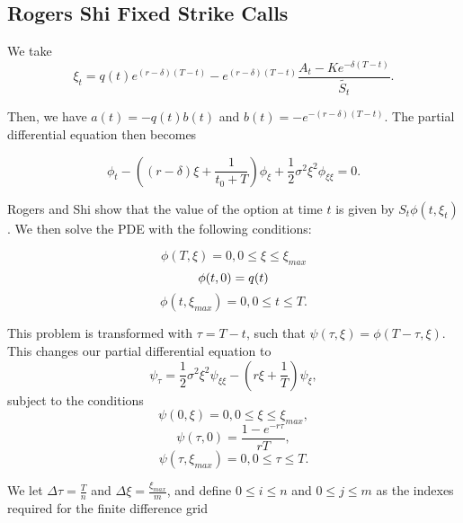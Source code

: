 \documentclass{article}
\begin{document}
\subsection{Rogers Shi Fixed Strike Calls}
We take
\begin{equation}
  \xi_t = q(t)e^{(r-\delta)(T-t)} - e^{(r-\delta)(T-t)}\frac{A_t - Ke^{-\delta(T-t)}}{\tilde{S_t}}.
\end{equation}

Then, we have \( a(t) = -q(t)b(t) \) and \(b(t) = -e^{-(r-\delta)(T-t)}\). The partial differential equation then becomes

\begin{equation}
  \phi_t - ( (r-\delta)\xi + \frac{1}{t_0 + T} ) \phi_\xi + \frac{1}{2}\sigma^2\xi^2\phi_{\xi\xi} = 0.
\end{equation}

Rogers and Shi show that the value of the option at time \(t\) is given by \(S_t\phi(t, \xi_t)\). We then solve the PDE with the following conditions:

\begin{equation}
  \phi(T, \xi) = 0, 0 \le \xi \le \xi_{max}
\end{equation}
\begin{equation}
  \phi(t, 0) = q(t) \\
\end{equation}
\begin{equation}
  \phi(t, \xi_{max}) = 0, 0 \le t \le T.
\end{equation}

This problem is transformed with \(\tau = T - t \), such that \(\psi(\tau, \xi) = \phi(T-\tau, \xi)\). This changes our partial differential equation to
\begin{equation}
  \psi_\tau = \frac{1}{2}\sigma^2\xi^2\psi_{\xi\xi} - (r\xi + \frac{1}{T})\psi_\xi,
\end{equation}
subject to the conditions
\begin{equation}
  \psi(0, \xi) = 0, 0 \le \xi \le \xi_{max},
\end{equation}
\begin{equation}
  \psi(\tau, 0) = \frac{1-e^{-r\tau}}{rT},
\end{equation}
\begin{equation}
  \psi(\tau, \xi_{max}) = 0, 0 \le \tau \le T.
\end{equation}

We let \(\Delta\tau = \frac{T}{n}\) and \(\Delta\xi = \frac{\xi_{max}}{m}\), and define \(0 \le i \le n\) and \(0 \le j \le m\) as the indexes required for the finite difference grid
\end{document}
